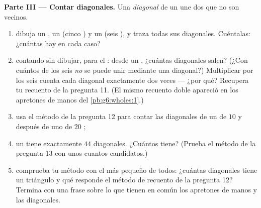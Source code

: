 \begin{problem}
\medskip
\noindent\textbf{Parte III --- Contar diagonales.}
Una \emph{diagonal} de un  une dos  que no son
vecinos.
\begin{enumerate}[resume]
  \item dibuja un , un  (cinco ) y un
         (seis ), y traza todas sus diagonales.
        Cuéntalas: ¿cuántas hay en cada caso?
  \item contando sin dibujar, para el : desde un
        , ¿cuántas diagonales salen? (¿Con cuántos de los
        seis  \emph{no} se puede unir mediante una diagonal?)
        Multiplicar por los seis  cuenta cada diagonal
        exactamente dos veces --- ¿por qué? Recupera tu recuento de la pregunta
        11. (El mismo recuento doble apareció en los apretones de manos
        del \cref{pb:g6:wholes:1}.)
  \item usa el método de la pregunta 12 para contar las diagonales de
        un  de $10$  y después de uno de $20$ ;
  \item un  tiene exactamente $44$ diagonales. ¿Cuántos 
        tiene? (Prueba el método de la pregunta 13 con unos cuantos
        candidatos.)
  \item comprueba tu método con el  más pequeño de todos: ¿cuántas
        diagonales tiene un triángulo y qué responde el
        método de recuento de la pregunta 12? Termina con una
        frase sobre lo que tienen en común los apretones de manos y las diagonales.
\end{enumerate}
\end{problem}
